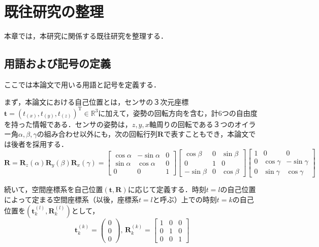 \section{既往研究の整理}\label{sec:researches}
本章では，本研究に関係する既往研究を整理する．\par
\subsection{用語および記号の定義}\label{subsec:definition}

ここでは本論文で用いる用語と記号を定義する．

まず，本論文における自己位置とは，センサの３次元座標$\mathbf{t}={
	(t_{(x)} , 
	t_{(y)} ,
	t_{(z)})
}^\mathrm{T}\in\mathbb{R}^3$に加えて，姿勢の回転方向を含む，計6つの自由度を持った情報である．センサの姿勢は，$z,y,x$軸周りの回転である３つのオイラー角$\alpha, \beta, \gamma$の組み合わせ以外にも，次の回転行列$\mathbf{R}$で表すこともでき，本論文では後者を採用する．
\begin{equation}
	\mathbf{R}=
	\mathbf{R}_{z}(\alpha) \mathbf{R}_{y}(\beta) \mathbf{R}_{x}(\gamma)=
	\left[\begin{array}{ccc}\cos \alpha & -\sin \alpha & 0 \\ \sin \alpha & \cos \alpha & 0 \\ 0 & 0 & 1\end{array}\right]
	\left[\begin{array}{ccc}\cos \beta & 0 & \sin \beta \\ 0 & 1 & 0 \\ -\sin \beta & 0 & \cos \beta\end{array}\right]
	\left[\begin{array}{ccc}1 & 0 & 0 \\ 0 & \cos \gamma & -\sin \gamma \\ 0 & \sin \gamma & \cos \gamma\end{array}\right]
\end{equation}
\par
続いて，空間座標系を自己位置$(\mathbf{t},  \mathbf{R})$に応じて定義する．時刻$t=l$の自己位置によって定まる空間座標系（以後，座標系$t=l$と呼ぶ）上での時刻$t=k$の自己位置を$(\mathbf{t}^{(l)}_k,  \mathbf{R}^{(l)}_k)$として，
\begin{equation}
	\mathbf{t}^{(k)}_k=\left(\begin{array}{c}
		0\\0\\0
	\end{array}\right), \,  
	\mathbf{R}^{(k)}_k=\left[\begin{array}{ccc} 1 & 0 & 0 \\ 0 & 1 & 0 \\ 0 & 0 & 1\end{array}\right]
\end{equation}
